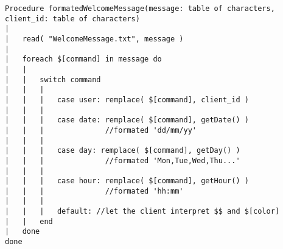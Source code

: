 \begin{lstlisting}
Procedure formatedWelcomeMessage(message: table of characters, client_id: table of characters)
|
|	read( "WelcomeMessage.txt", message )
|	
|	foreach $[command] in message do
|	|	
|	|	switch command
|	|	|	
|	|	|	case user: remplace( $[command], client_id )
|	|	|	
|	|	|	case date: remplace( $[command], getDate() )
|	|	|	           //formated 'dd/mm/yy'
|	|	|	
|	|	|	case day: remplace( $[command], getDay() )
|	|	|	           //formated 'Mon,Tue,Wed,Thu...'
|	|	|	
|	|	|	case hour: remplace( $[command], getHour() )
|	|	|	           //formated 'hh:mm'
|	|	|	
|	|	|	default: //let the client interpret $$ and $[color]
|	|	end
|	done
done
\end{lstlisting}